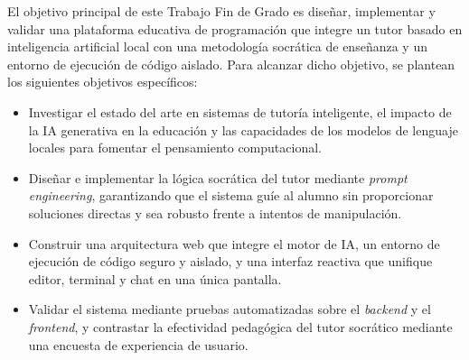 El objetivo principal de este Trabajo Fin de Grado es diseñar, implementar y validar una plataforma educativa de programación que integre un tutor basado en inteligencia artificial local con una metodología socrática de enseñanza y un entorno de ejecución de código aislado. Para alcanzar dicho objetivo, se plantean los siguientes objetivos específicos:

\begin{itemize}
    \item[--] Investigar el estado del arte en sistemas de tutoría inteligente, el impacto de la IA generativa en la educación y las capacidades de los modelos de lenguaje locales para fomentar el pensamiento computacional.

    \item[--] Diseñar e implementar la lógica socrática del tutor mediante \textit{prompt engineering}, garantizando que el sistema guíe al alumno sin proporcionar soluciones directas y sea robusto frente a intentos de manipulación.

    \item[--] Construir una arquitectura web que integre el motor de IA, un entorno de ejecución de código seguro y aislado, y una interfaz reactiva que unifique editor, terminal y chat en una única pantalla.

    \item[--] Validar el sistema mediante pruebas automatizadas sobre el \textit{backend} y el \textit{frontend}, y contrastar la efectividad pedagógica del tutor socrático mediante una encuesta de experiencia de usuario.
\end{itemize}
